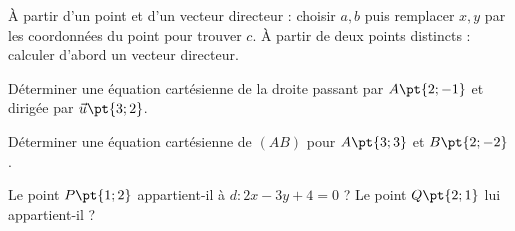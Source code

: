\begin{method}
À partir d'un point et d'un vecteur directeur : choisir $a,b$ puis remplacer $x,y$ par les coordonnées du point pour trouver $c$. À partir de deux points distincts : calculer d'abord un vecteur directeur.
\end{method}
\begin{example}Déterminer une équation cartésienne de la droite passant par $A\pt{2;-1}$ et dirigée par $\vec u\pt{3;2}$.\end{example}
\begin{example}Déterminer une équation cartésienne de $(AB)$ pour $A\pt{3;3}$ et $B\pt{2;-2}$.\end{example}
\begin{example}Le point $P\pt{1;2}$ appartient-il à $d:2x-3y+4=0$ ? Le point $Q\pt{2;1}$ lui appartient-il ?\end{example}

